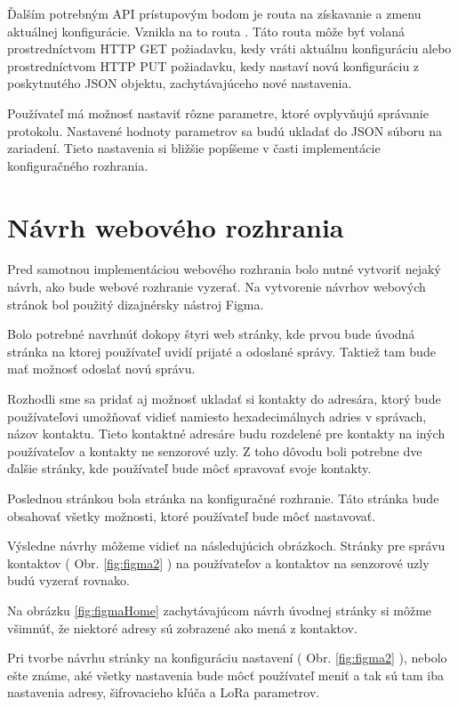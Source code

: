 \documentclass[slovak,master]{diploma}
\begin{document}
Ďalším potrebným API prístupovým bodom je routa na získavanie a zmenu aktuálnej konfigurácie. 
Vznikla na to routa . Táto routa môže byť volaná prostredníctvom HTTP GET požiadavku, kedy vráti aktuálnu konfiguráciu 
alebo prostredníctvom HTTP PUT požiadavku, kedy nastaví novú konfiguráciu z poskytnutého JSON objektu, zachytávajúceho nové nastavenia.

Používateľ má možnosť nastaviť rôzne parametre, ktoré ovplyvňujú správanie protokolu. Nastavené hodnoty parametrov sa budú ukladať do 
JSON súboru na zariadení. Tieto nastavenia si bližšie popíšeme v časti implementácie 
konfiguračného rozhrania.


\section{Návrh webového rozhrania}
Pred samotnou implementáciou webového rozhrania bolo nutné vytvoriť nejaký návrh, 
ako bude webové rozhranie vyzerať. Na vytvorenie návrhov webových stránok bol použitý dizajnérsky nástroj Figma.

Bolo potrebné navrhnúť dokopy štyri web stránky, kde prvou bude úvodná stránka na ktorej používateľ uvidí prijaté a odoslané správy. 
Taktiež tam bude mať možnosť odoslať novú správu.

Rozhodli sme sa pridať aj možnosť ukladať si kontakty do adresára, ktorý bude používateľovi umožňovať vidieť namiesto 
hexadecimálnych adries v správach, názov kontaktu. Tieto kontaktné adresáre budu rozdelené pre kontakty na iných používateľov a kontakty 
ne senzorové uzly. Z toho dôvodu boli potrebne dve ďalšie stránky, kde používateľ bude môcť spravovať svoje kontakty.

Poslednou stránkou bola stránka na konfiguračné rozhranie. Táto stránka bude obsahovať všetky možnosti, ktoré používateľ bude môcť nastavovať.

Výsledne návrhy môžeme vidieť na následujúcich obrázkoch. Stránky pre správu kontaktov ( Obr. \ref{fig:figma2} ) na používateľov a kontaktov na senzorové uzly budú vyzerať 
rovnako.

Na obrázku \ref{fig:figmaHome} zachytávajúcom návrh úvodnej stránky si môžme všimnúť, že niektoré adresy sú zobrazené ako mená z kontaktov.

Pri tvorbe návrhu stránky na konfiguráciu nastavení ( Obr. \ref{fig:figma2} ), nebolo ešte známe, aké všetky nastavenia 
bude môcť používateľ meniť a tak sú tam iba nastavenia adresy, šifrovacieho kľúča a LoRa parametrov.
\newpage
\end{document}
